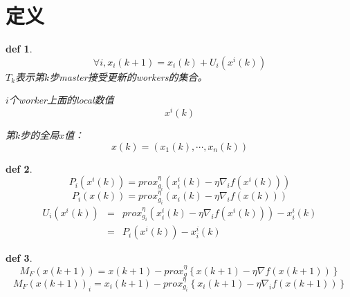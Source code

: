 \documentclass{ctexart}
\begin{document}
\newtheorem{mydef}{def}
\newtheorem{myth}{Th}
\newtheorem{myproof}{Proof}
\newtheorem{myas}{Assumption}

\section{定义}

\begin{mydef}
\begin{equation}\label{eq:1}
  \forall i,{x_i}\left( {k + 1} \right) = {x_i}\left( k \right) + {U_i}\left( {{x^i}\left( k \right)} \right)
\end{equation}
$T_k$表示第$k$步master接受更新的workers的集合。

$i$个worker上面的local数值
\begin{equation}\label{eq:2}
  x^{i}\left(k\right)
\end{equation}

第$k$步的全局$x$值：
\begin{equation}\label{eq:3}
  x\left(k\right)=\left(x_1(k),\cdots,x_n(k)\right)
\end{equation}
\end{mydef}

\begin{mydef}
\begin{equation}\label{eq:4}
    P_i \left(x^i \left(k\right)\right) = prox_{{g_i}}^\eta \left( {x_i^i\left( k \right) - \eta {\nabla _i}f\left( {{x^i}\left( k \right)} \right)} \right)
\end{equation}
\begin{equation}\label{eq:5}
    P_i \left(x \left(k\right)\right) = prox_{{g_i}}^\eta \left( {{x_i}\left( k \right) - \eta {\nabla _i}f\left( {x\left( k \right)} \right)} \right)
\end{equation}
\begin{eqnarray}
  {U_i}\left( {{x^i}\left( k \right)} \right) &=& prox_{{g_i}}^\eta \left( {x_i^i\left( k \right) - \eta {\nabla _i}f\left( {{x^i}\left( k \right)} \right)} \right) - x_i^i\left( k \right) \nonumber\\
   &=& P_i \left(x^i \left(k\right)\right) - x_i^i\left( k \right)
\end{eqnarray}
\end{mydef}

\begin{mydef}
\begin{equation}\label{eq:6}
  M_F\left(x\left( k+1\right)\right) =  x\left(k+1\right) - prox_{g}^{\eta} \left\{{x}\left( k+1\right) - \eta {\nabla}f\left( x\left(k+1\right)\right)\right\}
\end{equation}
\begin{equation}\label{eq:6.1}
  M_F\left(x\left( k+1\right)\right)_i =  x_i\left(k+1\right) - prox_{g_i}^{\eta} \left\{{x_i}\left( k+1\right) - \eta {\nabla_i}f\left( x\left(k+1\right)\right)\right\}
\end{equation}
\end{mydef}
\end{document}
